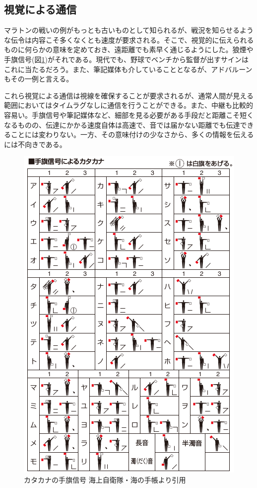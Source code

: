 \subsection{視覚による通信}

マラトンの戦いの例がもっとも古いものとして知られるが、戦況を知らせるような伝令は内容こそ多くなくとも速度が要求される。そこで、視覚的に伝えられるものに何らかの意味を定めておき、遠距離でも素早く通じるようにした。狼煙や手旗信号(図\ref{fig0_4})がそれである。現代でも、野球でベンチから監督が出すサインはこれに当たるだろう。また、筆記媒体も介していることとなるが、アドバルーンもその一例と言える。

これら視覚による通信は視線を確保することが要求されるが、通常人間が見える範囲においてはタイムラグなしに通信を行うことができる。また、中継も比較的容易い。手旗信号や筆記媒体など、細部を見る必要がある手段だと距離こそ短くなるものの、伝達にかかる速度自体は高速で、音では届かない距離でも伝達できることには変わりない。一方、その意味付けの少なさから、多くの情報を伝えるには不向きである。

\begin{figure}[p]
\centering
\includegraphics[width=\linewidth,keepaspectratio,bb=0 0 424 637]{fig/fig0_4.png}
\caption{カタカナの手旗信号 海上自衛隊・海の手帳より引用}\label{fig0_4}
\end{figure}


